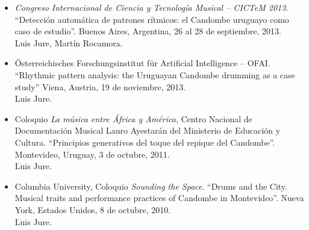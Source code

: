 \begin{itemize}
\item[ ]	%
\emph{Congreso Internacional de Ciencia y Tecnología Musical -- CICTeM 2013}.
``Detección automática de patrones rítmicos: el Candombe uruguayo como caso de estudio''.
Buenos Aires, Argentina, 26 al 28 de septiembre, 2013.\\
Luis Jure, Martín Rocamora.

\item[ ]	%
Österreichisches Forschungsinstitut für Artificial Intelligence -- OFAI.
``Rhythmic pattern analysis: the Uruguayan Candombe drumming as a case study''
Viena, Austria, 19 de noviembre, 2013.\\
Luis Jure.

\item[ ]	%
Coloquio \emph{La música entre África y América}, Centro Nacional de Documentación
Musical Lauro Ayestarán del Ministerio de Educación y Cultura.
``Principios generativos del toque del repique del Candombe''.
Montevideo, Uruguay, 3 de octubre, 2011.\\
Luis Jure.

\item[ ]	%
Columbia University, Coloquio \emph{Sounding the Space}.
``Drums and the City. Musical traits and performance
practices of Candombe in Montevideo''.
Nueva York, Estados Unidos, 8 de octubre, 2010.\\
Luis Jure.

\end{itemize}

